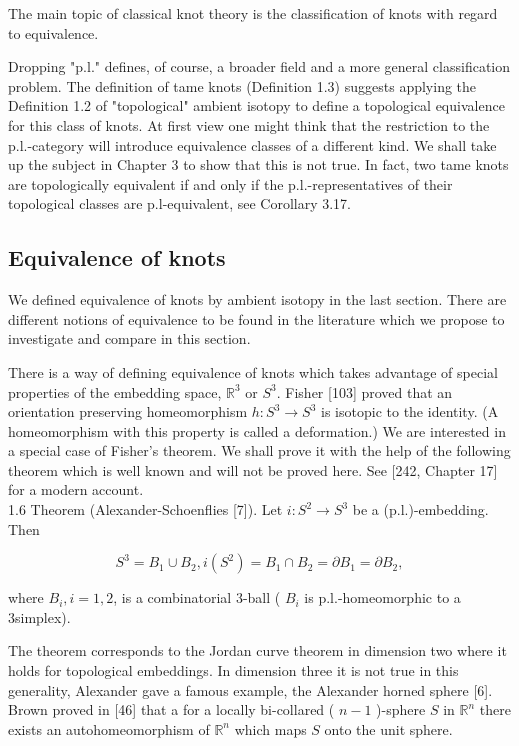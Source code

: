 \documentclass[10pt, letterpaper]{article}
\begin{document}
The main topic of classical knot theory is the classification of knots with regard to equivalence.

Dropping "p.l." defines, of course, a broader field and a more general classification problem. The definition of tame knots (Definition 1.3) suggests applying the Definition 1.2 of "topological" ambient isotopy to define a topological equivalence for this class of knots. At first view one might think that the restriction to the p.l.-category will introduce equivalence classes of a different kind. We shall take up the subject in Chapter 3 to show that this is not true. In fact, two tame knots are topologically equivalent if and only if the p.l.-representatives of their topological classes are p.l-equivalent, see Corollary 3.17.

\subsection{Equivalence of knots}
We defined equivalence of knots by ambient isotopy in the last section. There are different notions of equivalence to be found in the literature which we propose to investigate and compare in this section.

There is a way of defining equivalence of knots which takes advantage of special properties of the embedding space, $\mathbb{R}^{3}$ or $S^{3}$. Fisher [103] proved that an orientation preserving homeomorphism $h: S^{3} \rightarrow S^{3}$ is isotopic to the identity. (A homeomorphism with this property is called a deformation.) We are interested in a special case of Fisher's theorem. We shall prove it with the help of the following theorem which is well known and will not be proved here. See [242, Chapter 17] for a modern account.\\[0pt]
1.6 Theorem (Alexander-Schoenflies [7]). Let $i: S^{2} \rightarrow S^{3}$ be a (p.l.)-embedding. Then

$$
S^{3}=B_{1} \cup B_{2}, i\left(S^{2}\right)=B_{1} \cap B_{2}=\partial B_{1}=\partial B_{2},
$$

where $B_{i}, i=1,2$, is a combinatorial 3-ball ( $B_{i}$ is p.l.-homeomorphic to a 3simplex).

The theorem corresponds to the Jordan curve theorem in dimension two where it holds for topological embeddings. In dimension three it is not true in this generality, Alexander gave a famous example, the Alexander horned sphere [6]. Brown proved in [46] that a for a locally bi-collared ( $n-1$ )-sphere $S$ in $\mathbb{R}^{n}$ there exists an autohomeomorphism of $\mathbb{R}^{n}$ which maps $S$ onto the unit sphere.
\end{document}
